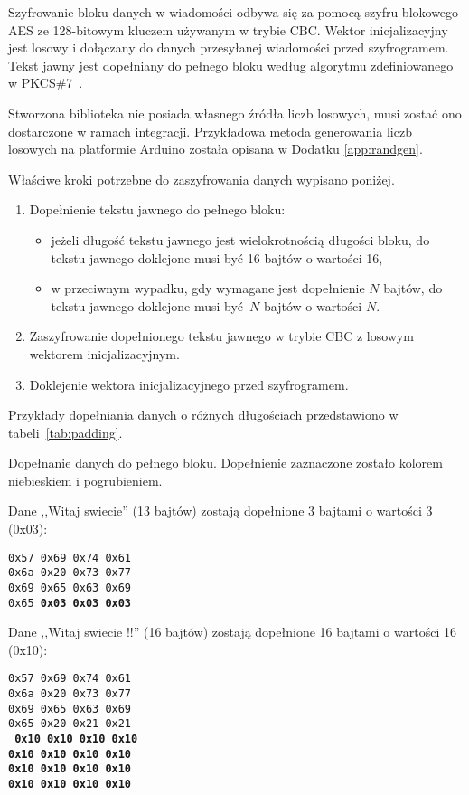Szyfrowanie bloku danych w wiadomości odbywa się za pomocą szyfru blokowego AES ze 128-bitowym kluczem używanym w trybie CBC. Wektor inicjalizacyjny jest losowy i dołączany do danych przesyłanej wiadomości przed szyfrogramem. Tekst jawny jest dopełniany do pełnego bloku według algorytmu zdefiniowanego w PKCS\#7~\cite{kaliski1998pkcs}.

Stworzona biblioteka nie posiada własnego źródła liczb losowych, musi zostać ono dostarczone w ramach integracji. Przykładowa metoda generowania liczb losowych na platformie Arduino została opisana w Dodatku \ref{app:randgen}.

Właściwe kroki potrzebne do zaszyfrowania danych wypisano poniżej.

\begin{enumerate}
\item Dopełnienie tekstu jawnego do pełnego bloku:
\begin{itemize}
\item jeżeli długość tekstu jawnego jest wielokrotnością długości bloku, do tekstu jawnego doklejone musi być 16 bajtów o wartości 16,
\item w przeciwnym wypadku, gdy wymagane jest dopełnienie $ N $ bajtów, do tekstu jawnego doklejone musi być $ N $ bajtów o wartości $ N $.
\end{itemize}
\item Zaszyfrowanie dopełnionego tekstu jawnego w trybie CBC z losowym wektorem inicjalizacyjnym.
\item Doklejenie wektora inicjalizacyjnego przed szyfrogramem.
\end{enumerate}

Przykłady dopełniania danych o różnych długościach przedstawiono w tabeli~\ref{tab:padding}.

\begin{table}[th]
\centering
\caption{Dopełnanie danych do pełnego bloku. Dopełnienie zaznaczone zostało kolorem niebieskiem i pogrubieniem.}
{\footnotesize Dane ,,Witaj swiecie'' (13 bajtów) zostają dopełnione 3 bajtami o wartości 3 (0x03):}

\texttt{0x57 0x69 0x74 0x61\\
0x6a 0x20 0x73 0x77\\
0x69 0x65 0x63 0x69\\
0x65 {\color[rgb]{0,0,1}\bfseries 0x03 0x03 0x03}}

{\footnotesize Dane ,,Witaj swiecie !!'' (16 bajtów) zostają dopełnione 16 bajtami o wartości 16 (0x10):}

\texttt{0x57 0x69 0x74 0x61\\
0x6a 0x20 0x73 0x77\\
0x69 0x65 0x63 0x69\\
0x65 0x20 0x21 0x21\\
{\color[rgb]{0,0,1}\bfseries
0x10 0x10 0x10 0x10\\
0x10 0x10 0x10 0x10\\
0x10 0x10 0x10 0x10\\
0x10 0x10 0x10 0x10\\
}
}

\label{tab:padding}
\end{table}

